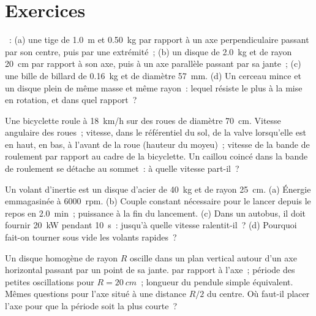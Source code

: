 \section{Exercices}

\begin{exercise}[$\star$]\label{exo:b2:rigid-body-mechanics:1}
~: (a) une tige de \qty{1.0}{m} et \qty{0.50}{kg} par rapport à un
axe perpendiculaire passant par son centre, puis par une extrémité~; (b) un
disque de \qty{2.0}{kg} et de rayon \qty{20}{cm} par rapport à son axe, puis à un
axe parallèle passant par sa jante~; (c) une bille de billard de \qty{0.16}{kg} et de
diamètre \qty{57}{mm}. (d) Un cerceau mince et un disque plein de même masse
et même rayon~: lequel résiste le plus à la mise en rotation, et dans quel rapport~?
\end{exercise}

\begin{exercise}[$\star$]\label{exo:b2:rigid-body-mechanics:2}
Une bicyclette roule à \qty{18}{km/h} sur des roues de diamètre \qty{70}{cm}.
Vitesse angulaire des roues~; vitesse, dans le référentiel du sol, de
la valve lorsqu'elle est en haut, en bas, à l'avant de la roue
(hauteur du moyeu)~; vitesse de la bande de roulement par rapport au cadre de la
bicyclette. Un caillou coincé dans la bande de roulement se détache au sommet~: à quelle
vitesse part-il~?
\end{exercise}

\begin{exercise}[$\star$]\label{exo:b2:rigid-body-mechanics:3}
Un volant d'inertie est un disque d'acier de \qty{40}{kg} et de rayon \qty{25}{cm}. (a) Énergie
emmagasinée à \qty{6000}{rpm}. (b) Couple constant nécessaire pour le lancer
depuis le repos en \qty{2.0}{min}~; puissance à la fin du lancement. (c) Dans un
autobus, il doit fournir \qty{20}{kW} pendant \qty{10}{s}~: jusqu'à quelle vitesse
ralentit-il~? (d) Pourquoi fait-on tourner sous vide les volants rapides~?
\end{exercise}

\begin{exercise}[$\star$]\label{exo:b2:rigid-body-mechanics:4}
Un disque homogène de rayon $R$ oscille dans un plan vertical autour d'un
axe horizontal passant par un point de sa jante.  par rapport à
l'axe~; période des petites oscillations pour $R = \qty{20}{cm}$~; longueur du
pendule simple équivalent. Mêmes questions pour l'axe situé à une
distance $R/2$ du centre. Où faut-il placer l'axe pour que la période soit la plus
courte~?
\end{exercise}

